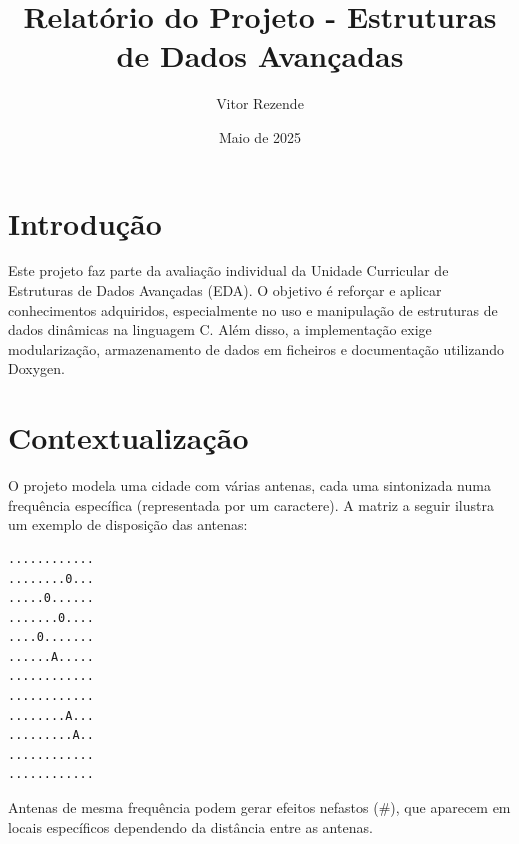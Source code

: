 \documentclass[a4paper,12pt]{article}
\title{Relatório do Projeto - Estruturas de Dados Avançadas}
\author{Vitor Rezende}
\date{Maio de 2025}
\begin{document}
\maketitle
\newpage

\tableofcontents
\newpage

\section{Introdução}
Este projeto faz parte da avaliação individual da Unidade Curricular de Estruturas de Dados Avançadas (EDA). O objetivo é reforçar e aplicar conhecimentos adquiridos, especialmente no uso e manipulação de estruturas de dados dinâmicas na linguagem C. Além disso, a implementação exige modularização, armazenamento de dados em ficheiros e documentação utilizando Doxygen.

\newpage

\section{Contextualização}
O projeto modela uma cidade com várias antenas, cada uma sintonizada numa frequência específica (representada por um caractere). A matriz a seguir ilustra um exemplo de disposição das antenas:

\begin{verbatim}
............
........0...
.....0......
.......0....
....0.......
......A.....
............
............
........A...
.........A..
............
............
\end{verbatim}

Antenas de mesma frequência podem gerar efeitos nefastos (\#), que aparecem em locais específicos dependendo da distância entre as antenas.

\newpage

\end{document}
